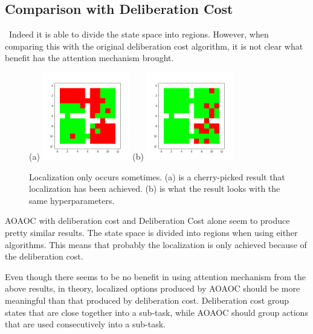 \documentclass{article}
\begin{document}
	\subsection*{Comparison with Deliberation Cost}
	\qquad \ Indeed it is able to divide the state space into regions. However, when comparing this with the original deliberation cost algorithm, it is not clear what benefit has the attention mechanism brought. 
	\begin{figure}[h]
		\centering
		\large{(a)}
		\includegraphics[width=1.5in]{goodPicked.png}
		\hspace{0.2in}
		\large{(b)}
		\includegraphics[width=1.5in]{badPicked.png}
		\caption{Localization only occurs sometimes. (a) is a cherry-picked result that localization has been achieved. (b) is what the result looks with the same hyperparameters.}
	\end{figure}

	\quad AOAOC with deliberation cost and Deliberation Cost alone seem to produce pretty similar results. The state space is divided into regions when using either algorithms. This means that probably the localization is only achieved because of the deliberation cost.
	
	\quad Even though there seems to be no benefit in using attention mechanism from the above results, in theory, localized options produced by AOAOC should be more meaningful than that produced by deliberation cost. Deliberation cost group states that are close together into a sub-task, while AOAOC should group actions that are used consecutively into a sub-task.
	
\end{document}
